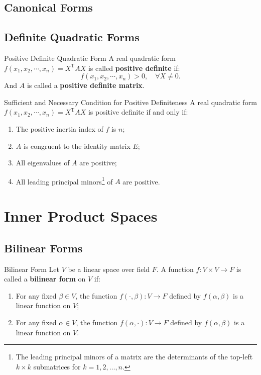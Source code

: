 \documentclass[11pt]{../../TexTemplate/elegantbook} %
\begin{document}
\section{Canonical Forms}
\section{Definite Quadratic Forms}
\begin{definition}{Positive Definite Quadratic Form}
    A real quadratic form \( f( x_{1}, x_{2}, \cdots, x_{n})=X^{\mathrm{T}}AX \) is called \textbf{positive definite} if:
    \[
    f( x_{1}, x_{2}, \cdots, x_{n}) > 0, \quad \forall X \neq 0.
    \]
    And \( A \) is called a \textbf{positive definite matrix}.
\end{definition}

\begin{theorem}{Sufficient and Necessary Condition for Positive Definiteness}
    A real quadratic form \( f( x_{1}, x_{2}, \cdots, x_{n})=X^{\mathrm{T}}AX \) is positive definite if and only if:
    \begin{enumerate}
        \item The positive inertia index of \( f \) is \( n \);
        \item \(A\) is congruent to the identity matrix \( E \);
        \item All eigenvalues of \( A \) are positive;
        \item All leading principal minors\footnote{
            The leading principal minors of a matrix are the determinants of 
            the top-left \( k \times k \) submatrices for \( k = 1, 2, \ldots, n \).
        } of \( A \) are positive.
    \end{enumerate}
    
\end{theorem}

\chapter{Inner Product Spaces}
\section{Bilinear Forms}
\begin{definition}{Bilinear Form}
    Let \( V \) be a linear space over field \( F \).
    A function \( f: V \times V \to F \) is called a \textbf{bilinear form} on \( V \) if:
    \begin{enumerate}
        \item For any fixed \( \beta \in V \), the function \( f(\cdot, \beta): V \to F \) defined by
            \( f(\alpha, \beta) \) is a linear function on \( V \);
        \item For any fixed \( \alpha \in V \), the function \( f(\alpha, \cdot): V \to F \) defined by
            \( f(\alpha, \beta) \) is a linear function on \( V \).
    \end{enumerate}
    
\end{definition}
\end{document}
